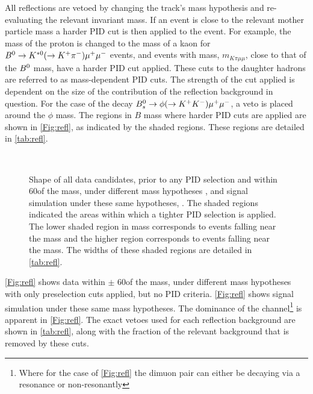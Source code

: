 All reflections are vetoed by changing the track's mass hypothesis and re-evaluating the relevant invariant mass. If an event is close to the relevant mother particle mass a harder PID cut is then applied to the event. For example, the mass of the proton is changed to the mass of a kaon for ${{B}^0}\rightarrow{\ensuremath{{K}^{*0}}}(\rightarrow {\ensuremath{{K}^+}}{\ensuremath{{\pi}^-}}){\mu^+\mu^-}$ events, and events with mass, $m_{K\pi\mu\mu}$, close to that of the ${{B}^0}$ mass, have a harder PID cut applied. These cuts to the daughter hadrons are referred to as mass-dependent PID cuts. The strength of the cut applied is dependent on the size of the contribution of the reflection background in question. For the case of the decay ${{B}^0_{s}}\rightarrow\phi(\rightarrow{\ensuremath{{K}^+}}{\ensuremath{{K}^-}}){\mu^+\mu^-}$, a veto is placed around the $\phi$ mass. The regions in $B$ mass where harder PID cuts are applied are shown in \autoref{Fig:refl}, as indicated by the shaded regions.  These regions are detailed in \autoref{tab:refl}.
\begin{figure}[h!]
  \def\nh{0.7\textwidth}
  \centering
   \\
  \textwidth
  \caption{Shape of all data candidates, prior to any PID selection and within 60\mevcc of the \Lb mass, under different mass hypotheses \protect{}, and \Lbpi signal simulation under these same hypotheses, \protect{}. The shaded regions indicated the areas within which a tighter PID selection is applied. The lower shaded region in mass corresponds to events falling near the \Bd mass and the higher region corresponds to events falling near the \Bs mass. The widths of these shaded regions are detailed in \autoref{tab:refl}.}
  \label{Fig:refl}
\end{figure}
\autoref{Fig:refl}\protect{} shows data within $\pm$ 60\mevcc of the \Lb mass, under different mass hypotheses with only preselection cuts applied, but no PID criteria. \autoref{Fig:refl}\protect{} shows \Lbpi signal simulation under these same mass hypotheses. The dominance of the \Bd\to\Kstarz\mumu channel\footnote{Where for the case of \autoref{Fig:refl}\protect{} the dimuon pair can either be decaying via a \jpsi resonance or non-resonantly} is apparent in \autoref{Fig:refl}\protect{}. The exact vetoes used for each reflection background are shown in \autoref{tab:refl}, along with the fraction of the relevant background that is removed by these cuts.

